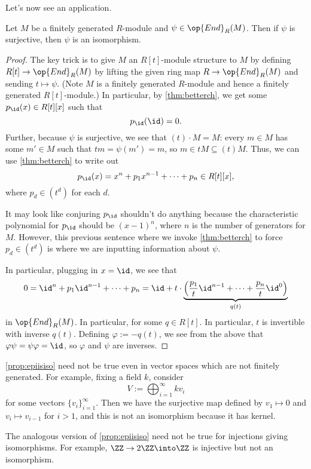 Let's now see an application.
\begin{proposition} \label{prop:epiisiso}
	Let $M$ be a finitely generated $R$-module and $\psi\in\op{End}_R(M)$. Then if $\psi$ is surjective, then $\psi$ is an isomorphism.
\end{proposition}
\begin{proof}
	The key trick is to give $M$ an $R[t]$-module structure to $M$ by defining $R[t]\to\op{End}_R(M)$ by lifting the given ring map $R\to\op{End}_R(M)$ and sending $t\mapsto\psi$. (Note $M$ is a finitely generated $R$-module and hence a finitely generated $R[t]$-module.) In particular, by \autoref{thm:betterch}, we get some $p_{\id}(x)\in R[t][x]$ such that
	\[p_{\id}({\id})=0.\]
	Further, because $\psi$ is surjective, we see that $(t)\cdot M=M$: every $m\in M$ has some $m'\in M$ such that $tm=\psi(m')=m$, so $m\in tM\subseteq(t)M$. Thus, we can use \autoref{thm:betterch} to write out
	\[p_{\id}(x)=x^n+p_1x^{n-1}+\cdots+p_n\in R[t][x],\]
	where $p_d\in\left(t^d\right)$ for each $d$.
	\begin{remark}[Nir]
		It may look like conjuring $p_{\id}$ shouldn't do anything because the characteristic polynomial for $p_{\id}$ should be $(x-1)^n$, where $n$ is the number of generators for $M$. However, this previous sentence where we invoke \autoref{thm:betterch} to force $p_d\in\left(t^d\right)$ is where we are inputting information about $\psi$.
	\end{remark}
	In particular, plugging in $x=\id$, we see that
	\[0={\id}^n+p_1{\id}^{n-1}+\cdots+p_n={\id}+t\cdot\underbrace{\left(\frac{p_1}t{\id}^{n-1}+\cdots+\frac{p_n}t{\id}^0\right)}_{q(t)}\]
	in $\op{End}_R(M)$. In particular, for some $q\in R[t]$. In particular, $t$ is invertible with inverse $q(t)$. Defining $\varphi:=-q(t)$, we see from the above that $\varphi\psi=\psi\varphi=\id$, so $\varphi$ and $\psi$ are inverses.
\end{proof}
\begin{remark}
	\autoref{prop:epiisiso} need not be true even in vector spaces which are not finitely generated. For example, fixing a field $k$, consider
	\[V:=\bigoplus_{i=1}^\infty kv_i\]
	for some vectors $\{v_i\}_{i=1}^\infty$. Then we have the surjective map defined by $v_1\mapsto0$ and $v_i\mapsto v_{i-1}$ for $i>1$, and this is not an isomorphism because it has kernel.
\end{remark}
\begin{remark}
	The analogous version of \autoref{prop:epiisiso} need not be true for injections giving isomorphisms. For example, $\ZZ\to2\ZZ\into\ZZ$ is injective but not an isomorphism.
\end{remark}
